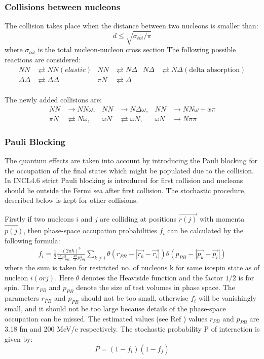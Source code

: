 \subsubsection{Collisions between nucleons}
The collision takes place when the distance between two nucleons is smaller than:
\begin{equation}
	d\leq\sqrt{\sigma_{tot}/\pi}
\end{equation}
where $\sigma_{tot}$ is the total nucleon-nucleon cross section
The following possible reactions are considered:
\begin{align*}
	NN & \rightleftarrows NN (elastic) &  NN & \rightleftarrows  N\Delta& N\Delta & \rightleftarrows N\Delta (\text{delta absorption})\\
	\Delta\Delta & \rightleftarrows \Delta\Delta & \pi N & \rightleftarrows \Delta& & 
\end{align*}
\\The newly added collisions are:
{\color{blue}
	\begin{align*}
		NN &\rightarrow NN\omega,&NN&\rightarrow N\Delta\omega , &NN&\rightarrow NN\omega + x\pi\\
		\pi N&\rightleftarrows N\omega, &\omega N&\rightleftarrows \omega N, &\omega N&\rightarrow N\pi\pi 
	\end{align*}
}
\subsubsection{Pauli Blocking }
The quantum effects are taken into account by introducing the Pauli blocking\cite{INCLboudard2002intranuclear} for the occupation of the final states which might be populated due to the collision. In INCL4.6 \cite{INCLboudard2013new} strict Pauli blocking is introduced for first collision and nucleons should lie outside the Fermi sea after first collision. The stochastic procedure, described below is kept for other collisions.\par
Firstly if two nucleons $i$ and $j$ are colliding at positions $\vec{r(j)}$ with momenta $\vec{p(j)}$, then phase-space occupation probabilities $f_i$ can be calculated by the following formula:
\begin{align}
	f_i=\frac{1}{2}\frac{\left(2\pi\hbar\right)^3}{\frac{4\pi}{3}r_{PB}^3\cdot\frac{4\pi}{3}p_{PB}^3}\sum_{k\ne i}\theta\!\left(r_{PB}-\left|\vec{r_k}-\vec{r_i}\right|\right)\theta\!\left(p_{PB}-\left|\vec{p_k}-\vec{p_i}\right|\right)
\end{align}
where the sum is taken for restricted no. of nucleons k for same isospin state as of nucleon $i(orj)$. Here $\theta$ denotes the Heaviside function and the factor $1/2$ is for spin. The $r_{PB}$ and $p_{PB}$ denote the size of test volumes in phase space. The parameters $r_{PB}$ and $p_{PB}$ should not be too small, otherwise $f_i$ will be vanishingly small, and it should not be too large because details of the phase-space occupation can be missed. The estimated values (see Ref \cite{INCL_CUGN_1997} ) values $r_{PB}$ and $p_{PB}$ are 3.18 fm and 200 MeV/c respectively.
The stochastic probability P of interaction is given by:
\begin{equation}
	P=(1-f_i)(1-f_j)
\end{equation}



